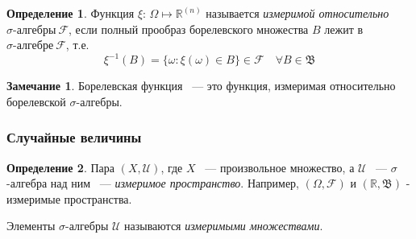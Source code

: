 \documentclass[oneside,final,14pt]{extreport}
\theoremstyle{plain}
\theoremstyle{definition}
\newtheorem*{defn}{Определение}
\newtheorem*{rmrk}{Замечание}
\theoremstyle{named}
\begin{document}
\begin{defn}
    Функция $\xi$: $\Omega \mapsto \mathbb{R}^{(n)}$ называется {\it измеримой относительно $\sigma\text{-алгебры} \: \mathcal{F}$}, если полный прообраз борелевского множества $B$ лежит в $\sigma\text{-алгебре} \: \mathcal{F}$, т.е. 
    \begin{equation*}
        \xi^{-1}(B) = \{\omega \colon \xi(\omega) \in B \} \in \mathcal{F} \quad \forall B \in \mathfrak{B}
    \end{equation*}
\end{defn}

\begin{rmrk}
    Борелевская функция ~--- это функция, измеримая относительно борелевской ${\sigma \text{-алгебры}}$.
\end{rmrk}

\subsubsection{Случайные величины}
\begin{defn}
    Пара $(X, \mathcal{U})$, где $X$ ~--- произвольное множество, а $\mathcal{U}$ ~--- $\sigma$-алгебра над ним ~--- {\it измеримое пространство}.
    Например, $(\Omega, \mathcal{F})$ и $(\mathbb{R}, \mathfrak{B})$ - измеримые пространства.
    
    Элементы $\sigma$-алгебры $\mathcal{U}$ называются {\it измеримыми множествами}.
\end{defn}
\end{document}
